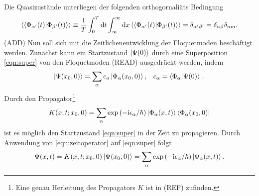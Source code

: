 Die Quasizustände unterliegen der folgenden orthogornaliäts Bedingung
\begin{align}
  \braket{\braket{\Phi_{\alpha' }(t)|\Phi_{\beta'}(t)}}\equiv \frac{1}{T} \int_0^T\mathrm{d}t \int_{\infty}^{\infty} \mathrm{d}x
   \braket{\braket{\Phi_{\alpha' }(t)|\Phi_{\beta'}(t)}}=\delta_{\alpha'\beta'}=\delta_{\alpha\beta}\delta_{nm}.
\end{align}
(ADD)
Nun soll sich mit die Zeitlichenentwicklung der Floquetmoden
beschäftigt werden.
Zunächst kann ein Startzustand $\ket{\Psi(0)}$ durch eine
Superposition \eqref{eqn:super} von den Floquetmoden (READ) ausgedrückt werden, indem
\begin{align}
  \ket{\Psi(x_0,0)}=\sum_\alpha c_a\ket{\Phi_\alpha(x_0,0)},&   &c_\alpha=\braket{\Phi_\alpha|\Psi(0)}.  \label{eqn:super}.
\end{align}
Durch den Propagator\footnote{Eine genau Herleitung des Propagators $K$ ist in (REF) zufinden.}
\begin{align}
  K(x,t;x_0,0)=\sum_\alpha \exp\left(-\mathrm{i}\epsilon_\alpha/ \hbar \right)\ket{\Phi_\alpha(x,t)}\bra{\Phi_\alpha(x_0,0)} \label{eqn:zeitoperator}
\end{align}
ist es möglich den Startzustand \eqref{eqn:super}
in der Zeit zu propagieren.
Durch Anwendung von \eqref{eqn:zeitoperator} auf \eqref{eqn:super}
folgt
\begin{align}
  \Psi(x,t)=K(x,t;x_0,0) \ket{\Psi(x_0,0)}=\sum_\alpha \exp\left(-\mathrm{i}\epsilon_\alpha/ \hbar \right)\ket{\Phi_\alpha(x,t)}.
\end{align}

